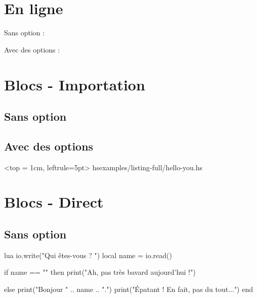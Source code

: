 \documentclass[theme = color]{../main/main}
\begin{document}
\section{En ligne}

Sans option :




Avec des options :





\section{Blocs - Importation}

\subsection{Sans option}





\subsection{Avec des options}

\tdoccodeinput[style=solarized-light, linenos]%
              <top = 1cm, leftrule=5pt>%
              {hs}{examples/listing-full/hello-you.hs}



\section{Blocs - Direct}

\subsection{Sans option}

\begin{tdoccode}{lua}
io.write("Qui êtes-vous ? ")
local name = io.read()

if name == "" then
    print("Ah, pas très bavard aujourd'hui !")

else
    print("Bonjour " .. name .. ".")
    print("Épatant ! En fait, pas du tout...")
end
\end{tdoccode}
\end{document}
